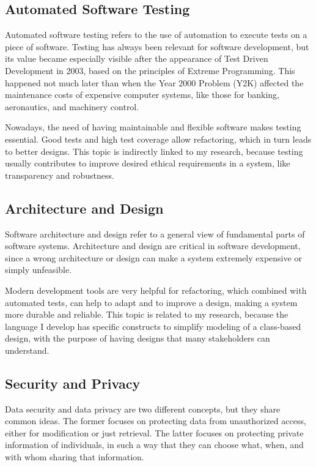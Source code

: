 \documentclass[11pt]{article}
\begin{document}
    \subsection{Automated Software Testing}

    Automated software testing refers to the use of automation to execute tests on a piece of software.
    Testing has always been relevant for software development, but its value became especially visible after the appearance of Test Driven Development in 2003, based on the principles of Extreme Programming.
    This happened not much later than when the Year 2000 Problem (Y2K) affected the maintenance costs of expensive computer systems, like those for banking, aeronautics, and machinery control.

    Nowadays, the need of having maintainable and flexible software makes testing essential.
    Good tests and high test coverage allow refactoring, which in turn leads to better designs.
    This topic is indirectly linked to my research, because testing usually contributes to improve desired ethical requirements in a system, like transparency and robustness.

    \subsection{Architecture and Design}

    Software architecture and design refer to a general view of fundamental parts of software systems.
    Architecture and design are critical in software development, since a wrong architecture or design can make a system extremely expensive or simply unfeasible.

    Modern development tools are very helpful for refactoring, which combined with automated tests, can help to adapt and to improve a design, making a system more durable and reliable.
    This topic is related to my research, because the language I develop has specific constructs to simplify modeling of a class-based design, with the purpose of having designs that many stakeholders can understand.

    \subsection{Security and Privacy}

    Data security and data privacy are two different concepts, but they share common ideas.
    The former focuses on protecting data from unauthorized access, either for modification or just retrieval.
    The latter focuses on protecting private information of individuals, in such a way that they can choose what, when, and with whom sharing that information.
\end{document}
